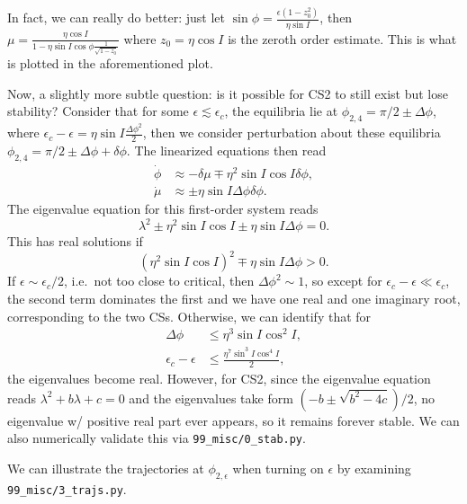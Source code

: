 \documentclass[11pt,
        usenames, %
        dvipsnames %
    ]{article}
\newcommand*{\p}[1]{\left(#1\right)}
\begin{document}
In fact, we can really do better: just let $\sin \phi = \frac{\epsilon\p{1 -
z_0^2}}{\eta \sin I}$, then $\mu = \frac{\eta \cos I}{1 - \eta \sin I \cos \phi
\frac{1}{\sqrt{1 - z_0}}}$ where $z_0 = \eta \cos I$ is the zeroth order
estimate. This is what is plotted in the aforementioned plot.

Now, a slightly more subtle question: is it possible for CS2 to still exist but
lose stability? Consider that for some $\epsilon\lesssim \epsilon_c$, the
equilibria lie at $\phi_{2, 4} = \pi/2 \pm \Delta \phi$, where $\epsilon_c -
\epsilon = \eta \sin I \frac{\Delta \phi^2}{2}$, then we consider perturbation
about these equilibria $\phi_{2, 4} = \pi/2 \pm \Delta \phi + \delta \phi$. The
linearized equations then read
\begin{subequations}
    \begin{align}
        \dot{\phi} &\approx -\delta \mu \mp \eta^2 \sin I \cos I \delta \phi,\\
        \dot{\mu} &\approx \pm\eta \sin I \Delta \phi \delta \phi.
    \end{align}
\end{subequations}
The eigenvalue equation for this first-order system reads
\begin{equation}
    \lambda^2 \pm \eta^2 \sin I \cos I \pm \eta \sin I \Delta \phi = 0.
\end{equation}
This has real solutions if
\begin{equation}
    \p{\eta^2 \sin I \cos I}^2 \mp \eta \sin I \Delta \phi > 0.
\end{equation}
If $\epsilon \sim \epsilon_c / 2$, i.e.\ not too close to critical, then
$\Delta \phi^2 \sim 1$, so except for $\epsilon_c - \epsilon \ll \epsilon_c$,
the second term dominates the first and we have one real and one imaginary root,
corresponding to the two CSs. Otherwise, we can identify that for
\begin{align*}
    \Delta \phi &\leq \eta^3 \sin I \cos^2 I,\\
    \epsilon_c - \epsilon &\leq \frac{\eta^7 \sin^3 I \cos^4 I}{2},
\end{align*}
the eigenvalues become real. However, for CS2, since the eigenvalue equation
reads $\lambda^2 + b\lambda + c = 0$ and the eigenvalues take form $\p{-b \pm
\sqrt{b^2 - 4c}}/2$, no eigenvalue w/ positive real part ever appears, so it
remains forever stable. We can also numerically validate this via
\lstinline{99_misc/0_stab.py}.

We can illustrate the trajectories at $\phi_{2, \epsilon}$ when turning on
$\epsilon$ by examining \lstinline{99_misc/3_trajs.py}.
\end{document}
